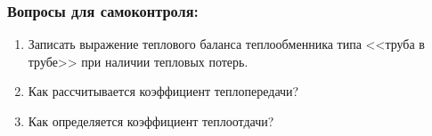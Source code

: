 \subsubsection*{Вопросы для самоконтроля:}
\begin{enumerate}
	\item Записать выражение теплового баланса теплообменника типа <<труба в трубе>> при наличии тепловых потерь.
	\item Как рассчитывается коэффициент теплопередачи?
	\item Как определяется коэффициент теплоотдачи?
\end{enumerate}



